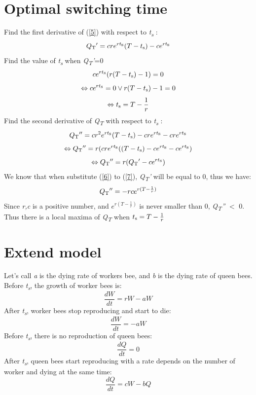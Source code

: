 \documentclass{article}
\begin{document}
\section{Optimal switching time}
Find the first derivative of (\ref{5}) with respect to \textit{t\textsubscript{s}} :
\[Q\textsubscript{T}'=cre^{rt\textsubscript{s}}(T-t\textsubscript{s})-ce^{rt\textsubscript{s}}\]
Find the value of \textit{t\textsubscript{s}} when \textit{Q\textsubscript{T}'}=0
\[ce^{rt\textsubscript{s}}(r(T-t\textsubscript{s})-1)=0\]
\[\Leftrightarrow ce^{rt\textsubscript{s}}=0 	\lor r(T-t\textsubscript{s})-1 =0 \]
\begin{equation}\label{6}
 \Leftrightarrow  t\textsubscript{s}=T-\frac{1}{r}   
\end{equation}
Find the second derivative of \textit{Q\textsubscript{T}} with respect to \textit{t\textsubscript{s}} : 
\[Q\textsubscript{T}''=cr^{2}e^{rt\textsubscript{s}}(T-t\textsubscript{s})-cre^{rt\textsubscript{s}}-cre^{rt\textsubscript{s}}\]
\[\Leftrightarrow Q\textsubscript{T}''=r(cre^{rt\textsubscript{s}}((T-t\textsubscript{s})-ce^{rt\textsubscript{s}}-ce^{rt\textsubscript{s}})\]
\begin{equation}\label{7}
    \Leftrightarrow Q\textsubscript{T}''=r(Q\textsubscript{T}'-ce^{rt\textsubscript{s}})
\end{equation}
We know that when substitute (\ref{6}) to (\ref{7}), \textit{Q\textsubscript{T}'} will be equal to 0, thus we have:
\[Q\textsubscript{T}''=-rce^{r(T-\frac{1}{r})}\]
Since \textit{r,c} is a positive number, and \(e^{r(T-\frac{1}{r})}\) is never smaller than 0, \textit{Q\textsubscript{T}''} $<$ 0.\\
Thus there is a local maxima of \textit{Q\textsubscript{T}}  when \(t\textsubscript{s}=T-\frac{1}{r}\)

\section{Extend model}
Let's call \textit{a} is the dying rate of workers bee, and \textit{b} is the dying rate of queen bees.\\
Before \textit{t\textsubscript{s}}, the growth of worker bees is:
\[\frac{dW}{dt}=rW-aW\]
After \textit{t\textsubscript{s}}, worker bees stop reproducing and start to die:
\[\frac{dW}{dt}=-aW\]
Before \textit{t\textsubscript{s}}, there is no reproduction of queen bees:
\[\frac{dQ}{dt}=0\]
After \textit{t\textsubscript{s}}, queen bees start reproducing with a rate depends on the number of worker and dying at the same time:
\[\frac{dQ}{dt}=cW-bQ\]
\end{document}
